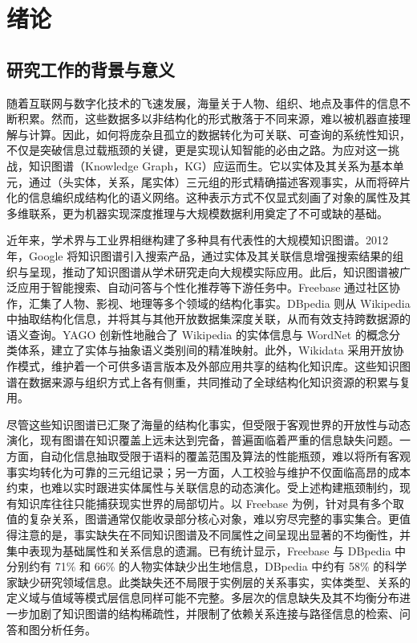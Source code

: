 \chapter{绪\hspace{6pt}论}
\label{chap:introduction}

\section{研究工作的背景与意义}

随着互联网与数字化技术的飞速发展，海量关于人物、组织、地点及事件的信息不断积累。然而，这些数据多以非结构化的形式散落于不同来源，难以被机器直接理解与计算。因此，如何将庞杂且孤立的数据转化为可关联、可查询的系统性知识，不仅是突破信息过载瓶颈的关键，更是实现认知智能的必由之路。为应对这一挑战，知识图谱（Knowledge Graph，KG）应运而生。它以实体及其关系为基本单元，通过（头实体，关系，尾实体）三元组的形式精确描述客观事实，从而将碎片化的信息编织成结构化的语义网络。这种表示方式不仅显式刻画了对象的属性及其多维联系，更为机器实现深度推理与大规模数据利用奠定了不可或缺的基础\cite{KGReview_Nickel_2016}。

近年来，学术界与工业界相继构建了多种具有代表性的大规模知识图谱。2012 年，Google 将知识图谱引入搜索产品，通过实体及其关联信息增强搜索结果的组织与呈现，推动了知识图谱从学术研究走向大规模实际应用\cite{singhal2012knowledgegraph}。此后，知识图谱被广泛应用于智能搜索、自动问答\cite{berant2013semantic}与个性化推荐\cite{wang2019kgat}等下游任务中。Freebase 通过社区协作，汇集了人物、影视、地理等多个领域的结构化事实\cite{Freebase_Bollacker_2008}。DBpedia 则从 Wikipedia 中抽取结构化信息，并将其与其他开放数据集深度关联，从而有效支持跨数据源的语义查询\cite{auer2007dbpedia}。YAGO 创新性地融合了 Wikipedia 的实体信息与 WordNet 的概念分类体系，建立了实体与抽象语义类别间的精准映射\cite{suchanek2007yago}。此外，Wikidata 采用开放协作模式，维护着一个可供多语言版本及外部应用共享的结构化知识库\cite{vrandecic2014wikidata}。这些知识图谱在数据来源与组织方式上各有侧重，共同推动了全球结构化知识资源的积累与复用。

尽管这些知识图谱已汇聚了海量的结构化事实，但受限于客观世界的开放性与动态演化，现有图谱在知识覆盖上远未达到完备，普遍面临着严重的信息缺失问题。一方面，自动化信息抽取受限于语料的覆盖范围及算法的性能瓶颈，难以将所有客观事实均转化为可靠的三元组记录；另一方面，人工校验与维护不仅面临高昂的成本约束，也难以实时跟进实体属性与关联信息的动态演化。受上述构建瓶颈制约，现有知识库往往只能捕获现实世界的局部切片。以 Freebase 为例，针对具有多个取值的复杂关系，图谱通常仅能收录部分核心对象，难以穷尽完整的事实集合\cite{dong2014knowledgevault}。更值得注意的是，事实缺失在不同知识图谱及不同属性之间呈现出显著的不均衡性，并集中表现为基础属性和关系信息的遗漏。已有统计显示，Freebase 与 DBpedia 中分别约有 71\% 和 66\% 的人物实体缺少出生地信息，DBpedia 中约有 58\% 的科学家缺少研究领域信息\cite{krompass2015dissertation}。此类缺失还不局限于实例层的关系事实，实体类型、关系的定义域与值域等模式层信息同样可能不完整\cite{krompass2015typeconstrained}。多层次的信息缺失及其不均衡分布进一步加剧了知识图谱的结构稀疏性，并限制了依赖关系连接与路径信息的检索、问答和图分析任务\cite{KGReview_Nickel_2016}。

